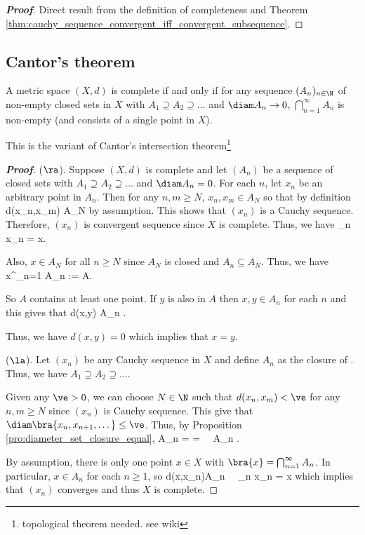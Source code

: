 \begin{proof}[\bf Proof]
Direct result from the definition of completeness and Theorem \ref{thm:cauchy_sequence_convergent_iff_convergent_subsequence}.
\end{proof}


\subsection{Cantor's theorem}


\begin{theorem}\label{thm:cantor_theorem_metric}
A metric space $(X,d)$ is complete if and only if for any sequence $(A_n)_{n\in \N}$ of non-empty closed sets in $X$ with $A_1 \supseteq A_2 \supseteq \dots $ and $\diam A_n \to 0$, $\bigcap^\infty_{n=1}A_n$ is non-empty (and consists of a single point in $X$).
\end{theorem}

\begin{remark}
This is the variant of Cantor's intersection theorem\footnote{topological theorem needed. see wiki}
\end{remark}



\begin{proof}[\bf Proof]
($\ra$). Suppose $(X,d)$ is complete and let $(A_n)$ be a sequence of closed sets with $A_1 \supseteq A_2 \supseteq \dots$ and $\diam A_n = 0$. For each $n$, let $x_n$ be an arbitrary point in $A_n$. Then for any $n,m\geq N$, $x_n,x_m\in A_N$ so that by definition
\be
d(x_n,x_m) \leq \diam A_N 
\ee
by assumption. This shows that $(x_n)$ is a Cauchy sequence. Therefore, $(x_n)$ is convergent sequence since $X$ is complete. Thus, we have
\be
\lim_{n\to \infty} x_n = x.
\ee

Also, $x\in A_N$ for all $n\geq N$ since $A_N$ is closed and $A_n \subseteq A_N$. Thus, we have
\be
x\in \bigcap^\infty_{n=1} A_n := A.
\ee

So $A$ contains at least one point. If $y$ is also in $A$ then $x,y\in A_n$ for each $n$ and this gives that
\be
d(x,y) \leq \diam A_n .
\ee

Thus, we have $d(x,y)=0$ which implies that $x=y$.

($\la$). Let $(x_n)$ be any Cauchy sequence in $X$ and define $A_n$ as the closure of
\be
{}.
\ee
Thus, we have $A_1\supseteq A_2 \supseteq \dots$.

Given any $\ve>0$, we can choose $N\in \N$ such that $d(x_n,x_m) < \ve$ for any $n,m\geq N$ since $(x_n)$ is Cauchy sequence. This give that $\diam\bra{x_n,x_{n+1},\dots } \leq \ve$. Thus, by Proposition \ref{pro:diameter_set_closure_equal},
\be
\diam A_n = \diam{} = \diam{} \leq \ve \ \ra \ \diam A_n .
\ee

By assumption, there is only one point $x\in X$ with $\bra{x} = \bigcap^\infty_{n=1} A_n$. In particular, $x\in A_n$ for each $n\geq 1$, so
\be
d(x,x_n)\leq \diam A_n  \ \ra\ \lim_{n\to\infty} x_n = x
\ee
which implies that $(x_n)$ converges and thus $X$ is complete.
\end{proof}

